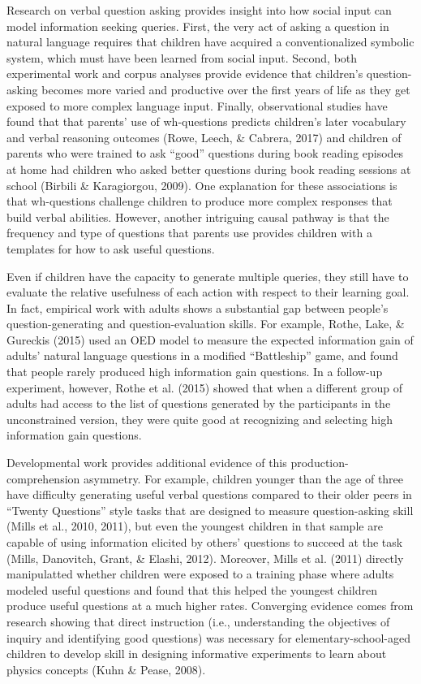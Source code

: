 \documentclass[oneside]{report}
\begin{document}
Research on verbal question asking provides insight into how social
input can model information seeking queries. First, the very act of
asking a question in natural language requires that children have
acquired a conventionalized symbolic system, which must have been
learned from social input. Second, both experimental work and corpus
analyses provide evidence that children's question-asking becomes more
varied and productive over the first years of life as they get exposed
to more complex language input. Finally, observational studies have
found that that parents' use of wh-questions predicts children's later
vocabulary and verbal reasoning outcomes (Rowe, Leech, \& Cabrera, 2017)
and children of parents who were trained to ask ``good'' questions
during book reading episodes at home had children who asked better
questions during book reading sessions at school (Birbili \&
Karagiorgou, 2009). One explanation for these associations is that
wh-questions challenge children to produce more complex responses that
build verbal abilities. However, another intriguing causal pathway is
that the frequency and type of questions that parents use provides
children with a templates for how to ask useful questions.

Even if children have the capacity to generate multiple queries, they
still have to evaluate the relative usefulness of each action with
respect to their learning goal. In fact, empirical work with adults
shows a substantial gap between people's question-generating and
question-evaluation skills. For example, Rothe, Lake, \& Gureckis (2015)
used an OED model to measure the expected information gain of adults'
natural language questions in a modified ``Battleship'' game, and found
that people rarely produced high information gain questions. In a
follow-up experiment, however, Rothe et al. (2015) showed that when a
different group of adults had access to the list of questions generated
by the participants in the unconstrained version, they were quite good
at recognizing and selecting high information gain questions.

Developmental work provides additional evidence of this
production-comprehension asymmetry. For example, children younger than
the age of three have difficulty generating useful verbal questions
compared to their older peers in ``Twenty Questions'' style tasks that
are designed to measure question-asking skill (Mills et al., 2010,
2011), but even the youngest children in that sample are capable of
using information elicited by others' questions to succeed at the task
(Mills, Danovitch, Grant, \& Elashi, 2012). Moreover, Mills et al.
(2011) directly manipulatted whether children were exposed to a training
phase where adults modeled useful questions and found that this helped
the youngest children produce useful questions at a much higher rates.
Converging evidence comes from research showing that direct instruction
(i.e., understanding the objectives of inquiry and identifying good
questions) was necessary for elementary-school-aged children to develop
skill in designing informative experiments to learn about physics
concepts (Kuhn \& Pease, 2008).
\end{document}
